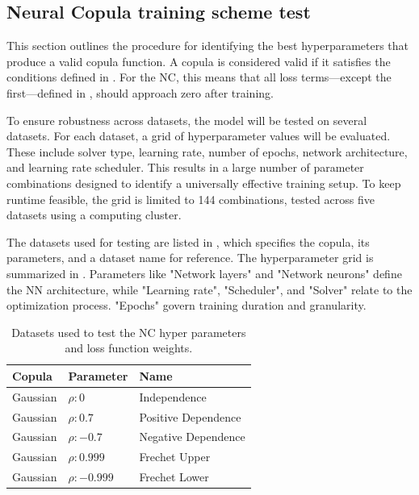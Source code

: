 \subsection{Neural Copula training scheme test}
This section outlines the procedure for identifying the best hyperparameters that produce a valid copula function. A copula is considered valid if it satisfies the conditions defined in . For the \gls{NC}, this means that all loss terms—except the first—defined in , should approach zero after training.

To ensure robustness across datasets, the model will be tested on several datasets. For each dataset, a grid of hyperparameter values will be evaluated. These include solver type, learning rate, number of epochs, network architecture, and learning rate scheduler. This results in a large number of parameter combinations designed to identify a universally effective training setup. To keep runtime feasible, the grid is limited to 144 combinations, tested across five datasets using a computing cluster.

The datasets used for testing are listed in , which specifies the copula, its parameters, and a dataset name for reference. The hyperparameter grid is summarized in . Parameters like "Network layers" and "Network neurons" define the \gls{NN} architecture, while "Learning rate", "Scheduler", and "Solver" relate to the optimization process. "Epochs" govern training duration and granularity.

\begin{table}[h!]
    \centering
    \caption{Datasets used to test the \gls{NC} hyper parameters and loss function weights.}
    \begin{tabular}{lll}
    \textbf{Copula} & \textbf{Parameter} & \textbf{Name}  \\
    \hline
    Gaussian & $\rho:0$ & Independence \\
    Gaussian & $\rho:0.7$ & Positive Dependence \\
    Gaussian & $\rho:-0.7$ & Negative Dependence \\
    Gaussian & $\rho:0.999$ & Frechet Upper \\
    Gaussian & $\rho:-0.999$ & Frechet Lower \\
    \end{tabular}
    \label{tab:DatasetsTestedOn}
\end{table}

